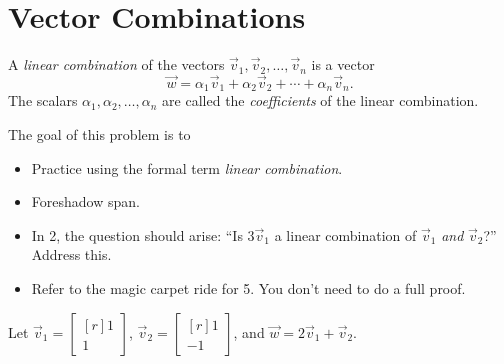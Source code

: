 \documentclass{problemset}
\newcommand{\mat}[1]{\begin{bmatrix*}[r]#1\end{bmatrix*}}
\begin{document}
\section*{Vector Combinations}
	\vspace{-1em}

	\begin{definition}
		A \emph{linear combination} of the vectors $\vec v_1,\vec v_2,\ldots,\vec v_n$ is
		a vector
		\[
			\vec w = \alpha_1\vec v_1+\alpha_2\vec v_2+\cdots+\alpha_n\vec v_n.
		\]
		The scalars $\alpha_1,\alpha_2,\ldots,\alpha_n$ are called the \emph{coefficients} of the linear combination.
	\end{definition}

	\question
	\label{ProbSkewBasis}
	\begin{annotation}
		\begin{goals}
			
			The goal of this problem is to
			\begin{itemize}
				\item Practice using the formal term \emph{linear combination}.
				\item Foreshadow span.
			\end{itemize}
		\end{goals}

		\begin{notes}
			\begin{itemize}
				\item In 2, the question should arise: ``Is $3\vec v_1$
					a linear combination of $\vec v_1$ \emph{and}
					$\vec v_2$?'' Address this.
				\item Refer to the magic carpet ride for 5. You don't
					need to do a full proof.
			\end{itemize}
		\end{notes}
	\end{annotation}
	Let $\vec v_1=\mat{1\\1}$, $\vec v_2=\mat{1\\-1}$, and $\vec w=2\vec v_1+\vec v_2$.
\end{document}
